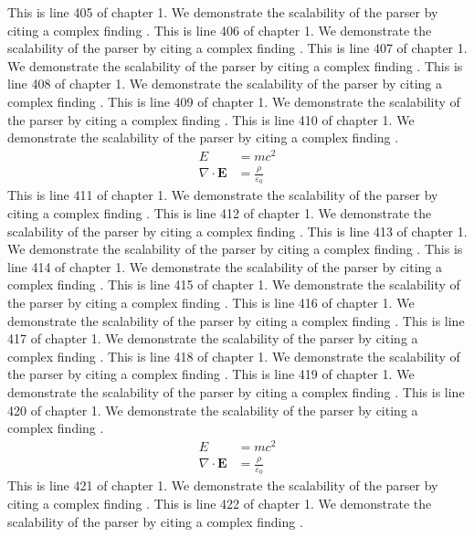 This is line 405 of chapter 1. We demonstrate the scalability of the parser by citing a complex finding \cite{ref1_405}.
This is line 406 of chapter 1. We demonstrate the scalability of the parser by citing a complex finding \cite{ref1_406}.
This is line 407 of chapter 1. We demonstrate the scalability of the parser by citing a complex finding \cite{ref1_407}.
This is line 408 of chapter 1. We demonstrate the scalability of the parser by citing a complex finding \cite{ref1_408}.
This is line 409 of chapter 1. We demonstrate the scalability of the parser by citing a complex finding \cite{ref1_409}.
This is line 410 of chapter 1. We demonstrate the scalability of the parser by citing a complex finding \cite{ref1_410}.
\begin{align*}
  E &= mc^2 \\
  \nabla \cdot \mathbf{E} &= \frac{\rho}{\varepsilon_0}
\end{align*}
This is line 411 of chapter 1. We demonstrate the scalability of the parser by citing a complex finding \cite{ref1_411}.
This is line 412 of chapter 1. We demonstrate the scalability of the parser by citing a complex finding \cite{ref1_412}.
This is line 413 of chapter 1. We demonstrate the scalability of the parser by citing a complex finding \cite{ref1_413}.
This is line 414 of chapter 1. We demonstrate the scalability of the parser by citing a complex finding \cite{ref1_414}.
This is line 415 of chapter 1. We demonstrate the scalability of the parser by citing a complex finding \cite{ref1_415}.
This is line 416 of chapter 1. We demonstrate the scalability of the parser by citing a complex finding \cite{ref1_416}.
This is line 417 of chapter 1. We demonstrate the scalability of the parser by citing a complex finding \cite{ref1_417}.
This is line 418 of chapter 1. We demonstrate the scalability of the parser by citing a complex finding \cite{ref1_418}.
This is line 419 of chapter 1. We demonstrate the scalability of the parser by citing a complex finding \cite{ref1_419}.
This is line 420 of chapter 1. We demonstrate the scalability of the parser by citing a complex finding \cite{ref1_420}.
\begin{align*}
  E &= mc^2 \\
  \nabla \cdot \mathbf{E} &= \frac{\rho}{\varepsilon_0}
\end{align*}
This is line 421 of chapter 1. We demonstrate the scalability of the parser by citing a complex finding \cite{ref1_421}.
This is line 422 of chapter 1. We demonstrate the scalability of the parser by citing a complex finding \cite{ref1_422}.
